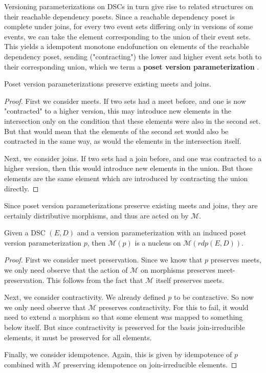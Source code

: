 \documentclass[hoptionsi,review,format=sigplan]{acmart}
\theoremstyle{definition}
\newcommand{\Mcc}{\mathcal{M}}
\begin{document}
Versioning parameterizations on DSCs in turn give rise to related structures on their reachable dependency posets. Since a reachable dependency poset is complete under joins, for every two event sets differing only in versions of some events, we can take the element corresponding to the union of their event sets. This yields a idempotent monotone endofunction on elements of the reachable dependency poset, sending ("contracting") the lower and higher event sets both to their corresponding union, which we term a \textbf{poset version parameterization} . 

\begin{lemma}
Poset version parameterizations preserve existing meets and joins.
\end{lemma}
\begin{proof}
First we consider meets. If two sets had a meet before, and one is now "contracted" to a higher version, this may introduce new elements in the intersection only on the condition that these elements were also in the second set. But that would mean that the elements of the second set would also be contracted in the same way, as would the elements in the intersection itself.

Next, we consider joins. If two sets had a join before, and one was contracted to a higher version, then this would introduce new elements in the union. But those elements are the same element which are introduced by contracting the union directly.
\end{proof}

Since poset version parameterizations preserve existing meets and joins, they are certainly distributive morphisms, and thus are acted on by \(\Mcc\). 

\begin{theorem} \label{dsc_nucleus}
Given a DSC \((E,D)\) and a version parameterization with an induced poset version parameterization \(p\), then \(\Mcc(p)\) is a nucleus on \(\Mcc(rdp(E,D))\).
\end{theorem}
\begin{proof}
First we consider meet preservation. Since we know that \(p\) preserves meets, we only need observe that the action of \(\Mcc\) on morphisms preserves meet-preservation. This follows from the fact that \(\Mcc\) itself preserves meets.


Next, we consider contractivity. We already defined \(p\) to be contractive. So now we only need observe that \(\Mcc\) preserves contractivity. For this to fail, it would need to extend a morphism so that some element was mapped to something below itself. But since contractivity is preserved for the basis join-irreducible elements, it must be preserved for all elements.

Finally, we consider idempotence. Again, this is given by idempotence of \(p\) combined with \(\Mcc\) preserving idempotence on join-irreducible elements.
\end{proof}
\end{document}
